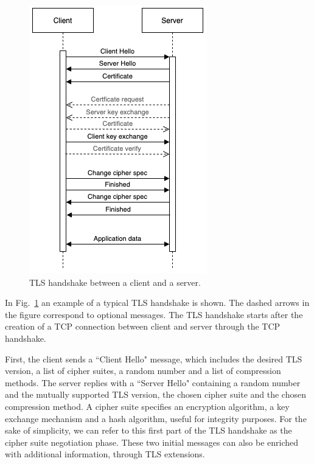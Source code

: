 \documentclass[a4paper,12pt]{article}
\def\myfig#1{Fig.~#1\xspace}
\begin{document}
\begin{figure}
\centerline{\includegraphics[scale=0.7]{img/tls.png}}
\caption{TLS handshake between a client and a server.}
\label{fig:tls}
\end{figure}

In \myfig{\ref{fig:tls}} an example of a typical TLS handshake is shown. The dashed arrows in the figure correspond to optional messages.
The TLS handshake starts after the creation of a TCP connection between client and server through the TCP handshake.

First, the client sends a ``Client Hello" message, which includes the desired TLS version, a list of cipher suites, a random number and a list of compression methods. The server replies with a ``Server Hello" containing a random number and the mutually supported TLS version, the chosen cipher suite and the chosen compression method. A cipher suite specifies an encryption algorithm, a key exchange mechanism and a hash algorithm, useful for integrity purposes.
For the sake of simplicity, we can refer to this first part of the TLS handshake as the cipher suite negotiation phase. These two initial messages can also be enriched with additional information, through TLS extensions.
\end{document}

